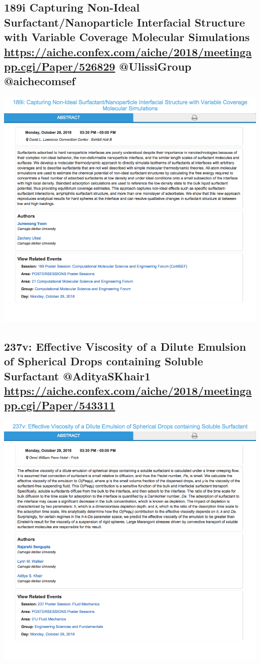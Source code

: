 \documentclass[11pt]{article}
\begin{document}
\subsection{189i Capturing Non-Ideal Surfactant/Nanoparticle Interfacial Structure with Variable Coverage Molecular Simulations \url{https://aiche.confex.com/aiche/2018/meetingapp.cgi/Paper/526829} @UlissiGroup @aichecomsef}
\label{sec:orga5c4d86}
\begin{center}
\includegraphics[width=.9\linewidth]{./526829.png}
\end{center}

\subsection{237v: Effective Viscosity of a Dilute Emulsion of Spherical Drops containing Soluble Surfactant @AdityaSKhair1 \url{https://aiche.confex.com/aiche/2018/meetingapp.cgi/Paper/543311}}
\label{sec:orgfa17fc6}
\begin{center}
\includegraphics[width=.9\linewidth]{./543311.png}
\end{center}
\end{document}
